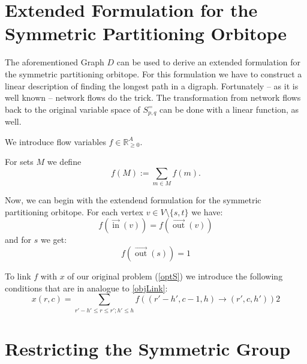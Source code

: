 \documentclass[a4paper]{amsart}
\theoremstyle{lemma}
\theoremstyle{definition}
\theoremstyle{remark}
\DeclareMathOperator{\In}{in}
\DeclareMathOperator{\Out}{out}
\newcommand{\ina}{\ensuremath{\vec{\In}}}
\newcommand{\outa}{\ensuremath{\vec{\Out}}}
\begin{document}



\section{Extended Formulation for the Symmetric Partitioning Orbitope}
The aforementioned Graph \(D\) can be used to derive an extended
formulation for the  symmetric partitioning orbitope.  For this
formulation we have to construct a linear description of finding the
longest path in a digraph.  Fortunately -- as it is well known --
network flows do the trick.  The transformation from network flows
back to the original variable space of \(S^=_{p, q}\) can be done with
a linear function, as well.

We introduce flow variables \(f \in \mathbb{R}^A_{\geq 0}\).  

For sets \(M\) we define
\[f (M) := \sum_{m\in M} f(m)\text{.}\]

Now, we can begin with the extendend formulation for the 
symmetric partitioning orbitope.  For each vertex \(v \in V \setminus
\{s, t\}\) we have:
\begin{equation}
f\left(\ina(v)\right) = f\left(\outa(v)\right)
\end{equation}
and for \(s\) we get:
\begin{equation}
f\left(\outa(s)\right) = 1
\end{equation}



To link \(f\) with \(x\) of our original problem (\ref{optS}) we
introduce the following conditions that are in analogue to \ref{objLink}:
\begin{equation}
  x \left( r, c \right) =
  \sum_{r' - h' \leq r \leq r'; h' \leq h} f\left(\left(r'-h', c-1, h\right)
    \rightarrow \left(r', c, h'\right) \right)
2\end{equation}

\section{Restricting the Symmetric Group}
\end{document}
